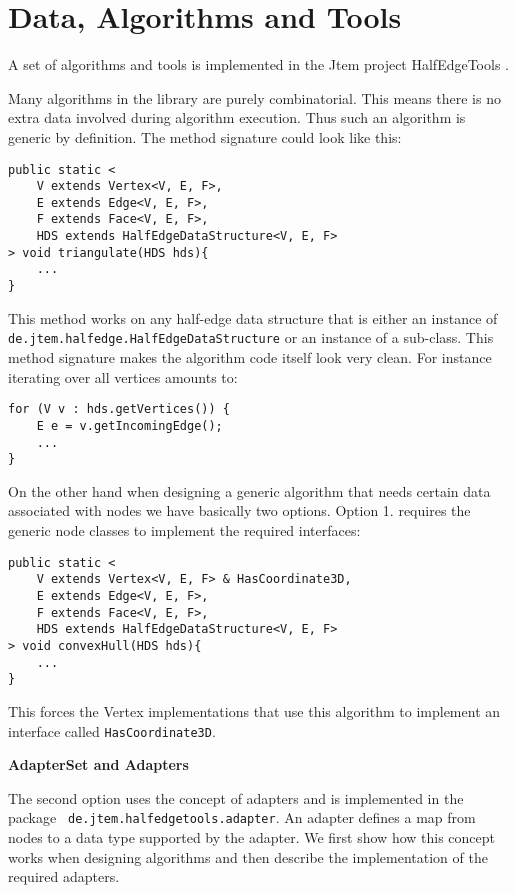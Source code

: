 \section{Data, Algorithms and Tools}

A set of algorithms and tools is implemented in the {\sc Jtem} project {\sc HalfEdgeTools}
\cite{JtemWebsite}. 

Many algorithms in the library are purely combinatorial. This means there is no extra data 
involved during algorithm execution. Thus such an algorithm is generic by definition. The
method signature could look like this:

\begin{lstlisting}
public static <
	V extends Vertex<V, E, F>,
	E extends Edge<V, E, F>,
	F extends Face<V, E, F>,
	HDS extends HalfEdgeDataStructure<V, E, F>
> void triangulate(HDS hds){
	...
}
\end{lstlisting}

This method works on any half-edge data structure that is either an instance of {\tt
de.jtem.half\-edge.HalfEdgeDataStructure} or an instance of a sub-class. This method
signature makes the algorithm code itself look very clean. For instance iterating over
all vertices amounts to:

\begin{lstlisting}
for (V v : hds.getVertices()) {
	E e = v.getIncomingEdge();
	...
}
\end{lstlisting}

On the other hand when designing a generic algorithm that needs certain data associated
with nodes we have basically two options. Option 1. requires the generic node classes to
implement the required interfaces:

\begin{lstlisting}
public static <
	V extends Vertex<V, E, F> & HasCoordinate3D,
	E extends Edge<V, E, F>,
	F extends Face<V, E, F>,
	HDS extends HalfEdgeDataStructure<V, E, F>
> void convexHull(HDS hds){
	...
}
\end{lstlisting}

This forces the Vertex implementations that use this algorithm to implement an interface
called {\tt HasCoordinate3D}.

{\bf AdapterSet and Adapters}

The second option uses the concept of adapters and is implemented in the package {\tt
de.jtem.\-halfedge\-tools.adapter}. An adapter defines a map from nodes to a data type supported 
by the adapter. We first show how this concept works when designing algorithms and then
describe the implementation of the required adapters. 


